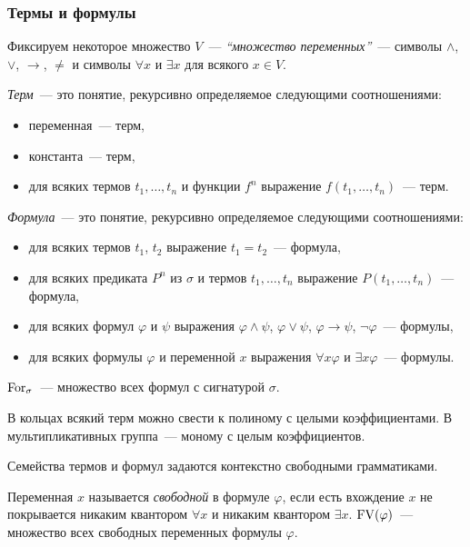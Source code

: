 \subsubsection{Термы и формулы}

\begin{definition}
	Фиксируем некоторое множество $V$~— \emph{“множество переменных”}~— символы $\wedge$, $\vee$, $\to$, $\neq$ и символы $\forall x$ и $\exists x$ для всякого $x \in V$.
	
	\emph{Терм}~— это понятие, рекурсивно определяемое следующими соотношениями:
	\begin{itemize}
		\item переменная~— терм,
		\item константа~— терм,
		\item для всяких термов $t_1, \dots, t_n$ и функции $f^n$ выражение $f(t_1, \dots, t_n)$~— терм.
	\end{itemize}

	\emph{Формула}~— это понятие, рекурсивно определяемое следующими соотношениями:
	\begin{itemize}
		\item для всяких термов $t_1$, $t_2$ выражение $t_1 = t_2$~— формула,
		\item для всяких предиката $P^n$ из $\sigma$ и термов $t_1, \dots, t_n$ выражение $P(t_1, \dots, t_n)$~— формула,
		\item для всяких формул $\varphi$ и $\psi$ выражения $\varphi \wedge \psi$, $\varphi \vee \psi$, $\varphi \to \psi$, $\neg \varphi$~— формулы,
		\item для всяких формулы $\varphi$ и переменной $x$ выражения $\forall x \varphi$ и $\exists x \varphi$~— формулы.
	\end{itemize}
	$\operatorname{For}_\sigma$~— множество всех формул с сигнатурой $\sigma$.
\end{definition}

\begin{exmpl}
	В кольцах всякий терм можно свести к полиному с целыми коэффициентами. В мультипликативных группа~— моному с целым коэффициентов.
\end{exmpl}

\begin{task}
	Семейства термов и формул задаются контекстно свободными грамматиками.
\end{task}

\begin{definition}
	Переменная $x$ называется \emph{свободной} в формуле $\varphi$, если есть вхождение $x$ не покрывается никаким квантором $\forall x$ и никаким квантором $\exists x$. $\operatorname{FV}(\varphi)$~— множество всех свободных переменных формулы $\varphi$.
\end{definition}


